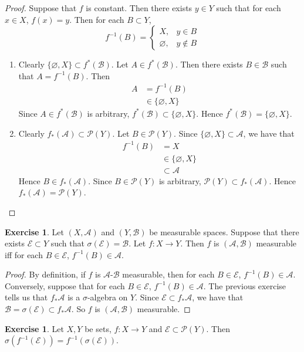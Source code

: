 \documentclass[12pt]{amsart}
\theoremstyle{definition}
\newtheorem{ex}[definition]{Exercise}
\newcommand{\sig}{\sigma}
\newcommand{\MA}{\mathcal{A}}
\newcommand{\MB}{\mathcal{B}}
\newcommand{\MP}{\mathcal{P}}
\newcommand{\ME}{\mathcal{E}}
\newcommand{\lex}[1]{\label{ex:#1}}
\begin{document}
	\begin{proof} Suppose that $f$ is constant. Then there exists $y \in Y$ such that for each $x \in X$, $f(x) = y$. Then for each $B \subset Y$, $$f^{-1}(B) = 
		\begin{cases}
			X, & y \in B \\
			\varnothing, & y \not \in B
		\end{cases}
		$$
		\begin{enumerate}
			\item Clearly $\{\varnothing, X\} \subset f^*(\MB)$. Let $A \in f^{*}(\MB)$. Then there exists $B \in \MB$ such that $A = f^{-1}(B)$. Then 
			\begin{align*}
				A
				& = f^{-1}(B) \\
				& \in \{\varnothing, X\}
			\end{align*}
			Since $A \in f^*(\MB)$ is arbitrary, $f^*(\MB) \subset \{\varnothing, X\}$. Hence $f^*(\MB) = \{\varnothing, X\}$.
			\item Clearly $f_*(\MA) \subset \MP(Y)$. Let $B \in \MP(Y)$. Since $\{\varnothing, X\} \subset \MA$, we have that 
			\begin{align*}
				f^{-1}(B) 
				& = X \\
				& \in \{\varnothing, X\} \\
				& \subset \MA
			\end{align*}
			Hence $B \in f_*(\MA)$. Since $B \in \MP(Y)$ is arbitrary, $\MP(Y) \subset f_*(\MA)$. Hence $f_*(\MA) = \MP(Y)$.
		\end{enumerate}
	\end{proof}
	
	\begin{ex} \lex{00000} 
		Let $(X,\MA)$ and $(Y, \MB)$ be measurable spaces. Suppose that there exists $\ME \subset Y$ such that $\sig(\ME) = \MB$. Let $f:X \rightarrow Y$. Then $f$ is $(\MA,\MB)$ measurable iff for each $B \in \ME$, $f^{-1}(B) \in \MA$.
	\end{ex}
	
	\begin{proof}
		By definition, if $f$ is $\MA$-$\MB$ measurable, then for each $B \in \ME$, $f^{-1}(B) \in \MA$. Conversely, suppose that for each $B \in \ME$, $f^{-1}(B) \in \MA$. The previous exercise tells us that $f_*\MA$ is a $\sig$-algebra on $Y$. Since $\ME \subset f_*\MA$, we have that $\MB = \sig(\ME) \subset f_*\MA$. So $f$ is $(\MA,\MB)$ measurable.
	\end{proof}
	
	\begin{ex} \lex{00000} 
		Let $X,Y$ be sets, $f:X \rightarrow Y$ and $\ME \subset \MP(Y)$. Then $\sig(f^{-1}(\ME)) = f^{-1}(\sig(\ME))$. 
	\end{ex}
	
\end{document}
